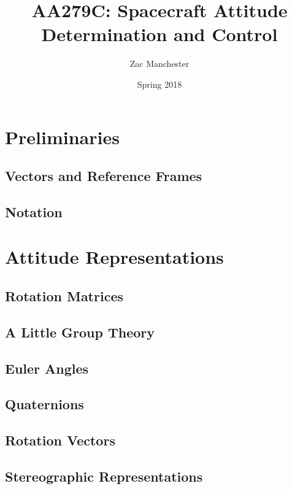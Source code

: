 \documentclass[11pt,letterpaper]{report}
\begin{document}
\title{AA279C: Spacecraft Attitude Determination and Control}
\author{Zac Manchester}
\date{Spring 2018}
\maketitle

\chapter{Preliminaries}

\section{Vectors and Reference Frames}

\section{Notation}

\chapter{Attitude Representations}

\section{Rotation Matrices}

\section{A Little Group Theory}

\section{Euler Angles}

\section{Quaternions}

\section{Rotation Vectors}

\section{Stereographic Representations}
\end{document}
